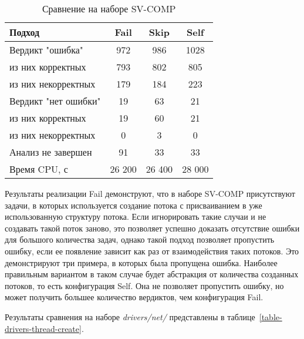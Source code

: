   \begin{table}[h]\footnotesize \centering
    \caption{Сравнение на наборе SV-COMP}
  	\label{table-svcomp-thread-create}
    \begin{tabular}{ | l | c | c | c |}
      \hline
      Подход         				& Fail 	& Skip 	& Self  	\\ \hline
      Вердикт "ошибка" 				& 972   & 986   & 1028       \\ 
  \hspace{0.5cm} из них корректных 	& 793 	& 802 	& 805    	\\ 
  \hspace{0.5cm} из них некорректных & 179 	& 184 	& 223     	\\ \hline
      Вердикт "нет ошибки"  		& 19    & 63    & 21       	\\ 
  \hspace{0.5cm} из них корректных 	& 19 	& 60    & 21      	\\
  \hspace{0.5cm} из них некорректных & 0 	& 3    	& 0     	\\ \hline
      Анализ не завершен       		& 91    & 33    & 33    	\\ \hline
      Время CPU, с   				& 26 200 & 26 400 & 28 000  \\ 
      \hline
    \end{tabular}
  \end{table}

Результаты реализации Fail демонструют, что в наборе SV-COMP присутствуют задачи, в которых используется создание потока с присваиванием в уже использованную структуру потока. 
Если игнорировать такие случаи и не создавать такой поток заново, это позволяет успешно доказать отсутствие ошибки для большого количества задач, однако такой подход позволяет пропустить ошибку, если ее появление зависит как раз от взаимодействия таких потоков.
Это демонстрируют три примера, в которых была пропущена ошибка.
Наиболее правильным вариантом в таком случае будет абстракция от количества созданных потоков, то есть конфигурация Self. 
Она не позволяет пропустить ошибку, но может получить большее количество вердиктов, чем конфигурация Fail.

Результаты сравнения на наборе \textit{drivers/net/} представлены в таблице~\ref{table-drivers-thread-create}.

